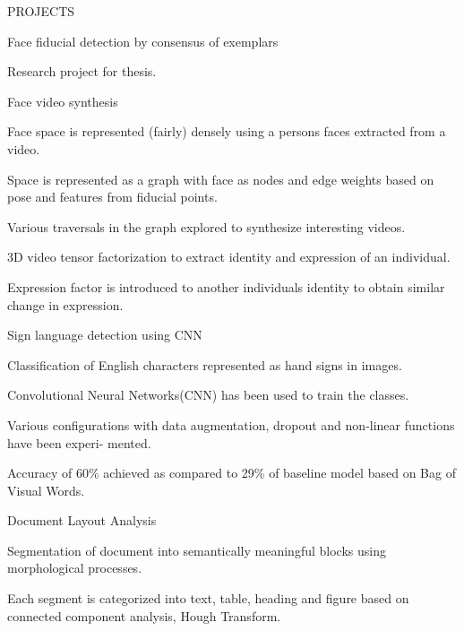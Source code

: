 \documentclass{resume} %
\begin{document}

\begin{rSection}{PROJECTS}

\begin{rSubsection}{Face fiducial detection by consensus of exemplars}{}{}{}
\item Research project for thesis.
\end{rSubsection}

\begin{rSubsection}{Face video synthesis}{}{}{}
\item Face space is represented (fairly) densely using a person\textsc{}s faces extracted from a video. 
\item Space is represented as a graph with face as nodes and edge weights based on pose and features from fiducial points.
\item Various traversals in the graph explored to synthesize interesting videos.
\item 3D video tensor factorization to extract identity and expression of an individual.
\item Expression factor is introduced to another individual\textsc{}s identity to obtain similar change in expression.
\end{rSubsection}

\begin{rSubsection}{Sign language detection using CNN}{}{}{}
\item Classification of English characters represented as hand signs in images.
\item Convolutional Neural Networks(CNN) has been used to train the classes. 
\item Various configurations with data augmentation, dropout and non-linear functions have been experi-
mented.
\item Accuracy of 60\% achieved as compared to 29\% of baseline model based on Bag of Visual Words.
\end{rSubsection}

\clearpage
\begin{rSubsection}{Document Layout Analysis}{}{}{}
\item Segmentation of document into semantically meaningful blocks using morphological processes.
\item Each segment is categorized into text, table, heading and figure based on connected component analysis, Hough Transform. 
\end{rSubsection}


\end{rSection}
\end{document}
